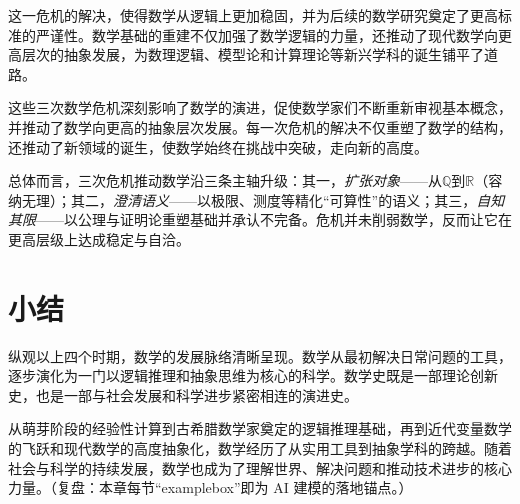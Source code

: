 这一危机的解决，使得数学从逻辑上更加稳固，并为后续的数学研究奠定了更高标准的严谨性。数学基础的重建不仅加强了数学逻辑的力量，还推动了现代数学向更高层次的抽象发展，为数理逻辑、模型论和计算理论等新兴学科的诞生铺平了道路。

这些三次数学危机深刻影响了数学的演进，促使数学家们不断重新审视基本概念，并推动了数学向更高的抽象层次发展。每一次危机的解决不仅重塑了数学的结构，还推动了新领域的诞生，使数学始终在挑战中突破，走向新的高度。

总体而言，三次危机推动数学沿三条主轴升级：其一，{\itshape 扩张对象}——从$\mathbb{Q}$到$\mathbb{R}$（容纳无理）；其二，{\itshape 澄清语义}——以极限、测度等精化“可算性”的语义；其三，{\itshape 自知其限}——以公理与证明论重塑基础并承认不完备。危机并未削弱数学，反而让它在更高层级上达成稳定与自洽。

\section{小结}
纵观以上四个时期，数学的发展脉络清晰呈现。数学从最初解决日常问题的工具，逐步演化为一门以逻辑推理和抽象思维为核心的科学。数学史既是一部理论创新史，也是一部与社会发展和科学进步紧密相连的演进史。

从萌芽阶段的经验性计算到古希腊数学家奠定的逻辑推理基础，再到近代变量数学的飞跃和现代数学的高度抽象化，数学经历了从实用工具到抽象学科的跨越。随着社会与科学的持续发展，数学也成为了理解世界、解决问题和推动技术进步的核心力量。{（复盘：本章每节“examplebox”即为 AI 建模的落地锚点。）}

